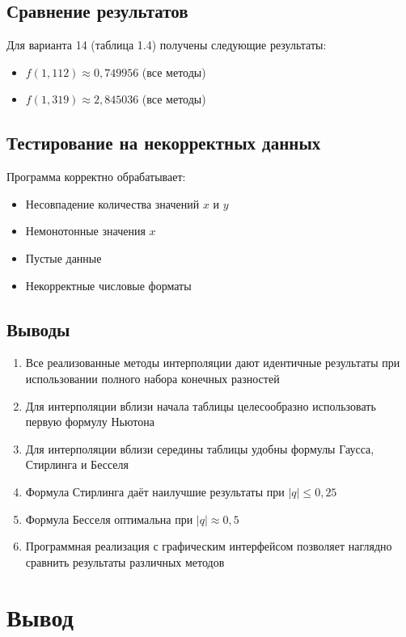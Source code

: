 \subsection{Сравнение результатов}

Для варианта 14 (таблица 1.4) получены следующие результаты:
\begin{itemize}
\item $f(1{,}112) \approx 0{,}749956$ (все методы)
\item $f(1{,}319) \approx 2{,}845036$ (все методы)
\end{itemize}

\subsection{Тестирование на некорректных данных}

Программа корректно обрабатывает:
\begin{itemize}
\item Несовпадение количества значений $x$ и $y$
\item Немонотонные значения $x$
\item Пустые данные
\item Некорректные числовые форматы
\end{itemize}

\subsection{Выводы}

\begin{enumerate}
\item Все реализованные методы интерполяции дают идентичные результаты при использовании полного набора конечных разностей
\item Для интерполяции вблизи начала таблицы целесообразно использовать первую формулу Ньютона
\item Для интерполяции вблизи середины таблицы удобны формулы Гаусса, Стирлинга и Бесселя
\item Формула Стирлинга даёт наилучшие результаты при $|q| \leq 0{,}25$
\item Формула Бесселя оптимальна при $|q| \approx 0{,}5$
\item Программная реализация с графическим интерфейсом позволяет наглядно сравнить результаты различных методов
\end{enumerate}

\section{Вывод}

